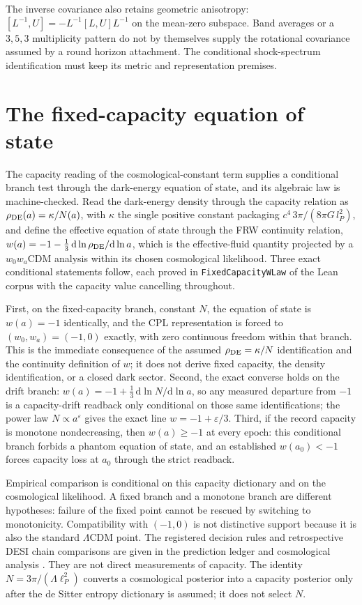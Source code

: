 \documentclass[11pt]{article}
\theoremstyle{remark}
\begin{document}
The inverse covariance also retains geometric anisotropy:
\([L^{-1},U]=-L^{-1}[L,U]L^{-1}\) on the mean-zero subspace.
Band averages or a \(3,5,3\) multiplicity pattern do not
by themselves supply the rotational covariance assumed by a round
horizon attachment. The conditional shock-spectrum identification must
keep its metric and representation premises.

\section{The fixed-capacity equation of state}

The capacity reading of the cosmological-constant term supplies a
conditional branch test through the dark-energy equation of state, and its
algebraic law is machine-checked. Read the
dark-energy density through the capacity relation as
\(\rho_{\rm DE}(a)=\kappa/N(a)\), with \(\kappa\) the single positive
constant packaging \(c^4\,3\pi/(8\pi G\,l_P^2)\), and define the effective
equation of state through the FRW continuity relation,
\(w(a)=-1-\tfrac13\,\mathrm d\ln\rho_{\rm DE}/\mathrm d\ln a\), which is
the effective-fluid quantity projected by a \(w_0w_a\mathrm{CDM}\)
analysis within its chosen cosmological likelihood. Three exact
conditional statements follow, each proved in
\texttt{FixedCapacityWLaw} of the Lean corpus with the capacity value
cancelling throughout.

First, on the fixed-capacity branch, constant \(N\), the equation of state
is \(w(a)=-1\) identically, and the CPL representation is forced to
\((w_0,w_a)=(-1,0)\) exactly, with zero continuous freedom within that
branch. This is the immediate consequence of the assumed
\(\rho_{\rm DE}=\kappa/N\) identification and the continuity definition of
\(w\); it does not derive fixed capacity, the density identification, or a
closed dark sector. Second, the exact converse holds on the drift branch:
\(w(a)=-1+\tfrac13\,\mathrm d\ln N/\mathrm d\ln a\), so any measured
departure from \(-1\) is a capacity-drift readback only conditional on
those same identifications; the power law
\(N\propto a^{\varepsilon}\) gives the exact line
\(w=-1+\varepsilon/3\). Third, if the record capacity is monotone
nondecreasing, then \(w(a)\ge-1\) at every epoch: this conditional branch
forbids a phantom equation of state, and an established
\(w(a_0)<-1\) forces capacity loss at \(a_0\) through the strict readback.

Empirical comparison is conditional on this capacity dictionary and on the
cosmological likelihood. A fixed branch and a monotone branch are different
hypotheses: failure of the fixed point cannot be rescued by switching to
monotonicity. Compatibility with $(-1,0)$ is not distinctive support because
it is also the standard $\Lambda$CDM point. The registered decision rules and
retrospective DESI chain comparisons are given in the prediction ledger and
cosmological analysis \cite{ophladder,ophcosmoledger,desidr2}. They are not
direct measurements of capacity. The identity
$N=3\pi/(\Lambda\ell_P^2)$ converts a cosmological posterior into a capacity
posterior only after the de Sitter entropy dictionary is assumed; it does
not select $N$.
\end{document}
